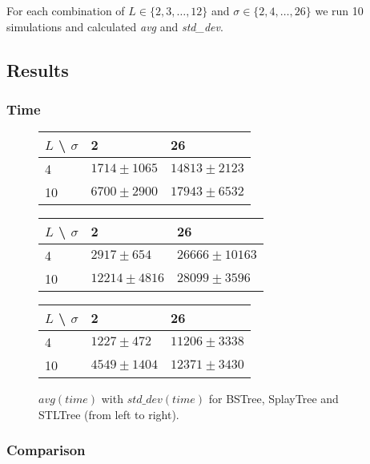 \documentclass[12pt,a4paper]{article}
\begin{document}
For each combination of $L \in \{2,3,\ldots,12\}$ and $\sigma \in \{2,4,\ldots,26\}$ we run 10 simulations and calculated \emph{avg} and \emph{std\_dev}. 

\newpage
\subsection{Results} 

\subsubsection{Time} 

\begin{figure}[h]
  \centering
  \begin{tabular}{|l|l|l|}
    \hline
    $L$ \textbackslash{} $\sigma$ & 2 & 26 \\
    \hline
    4  & $1714 \pm 1065$ & $14813 \pm 2123$ \\
    \hline
    10 & $6700 \pm 2900$ & $17943 \pm 6532$ \\
    \hline
  \end{tabular}
  \begin{tabular}{|l|l|l|}
    \hline
    $L$ \textbackslash{} $\sigma$ & 2 & 26 \\
    \hline
    4  & $2917 \pm 654$ & $26666 \pm 10163$ \\
    \hline
    10 & $12214 \pm 4816$ & $28099 \pm 3596$ \\
    \hline
  \end{tabular}
  \begin{tabular}{|l|l|l|}
    \hline
    $L$ \textbackslash{} $\sigma$ & 2 & 26 \\
    \hline
    4  & $1227 \pm 472$ & $11206 \pm 3338$ \\
    \hline
    10 & $4549 \pm 1404$ & $12371 \pm 3430$ \\
    \hline
  \end{tabular}
  \caption{$avg(time)$ with $std\_dev(time)$ for BSTree, SplayTree and STLTree (from left to right).}
  \label{fig:avg_std_time_table}
\end{figure}

\subsubsection{Comparison} 
\end{document}
